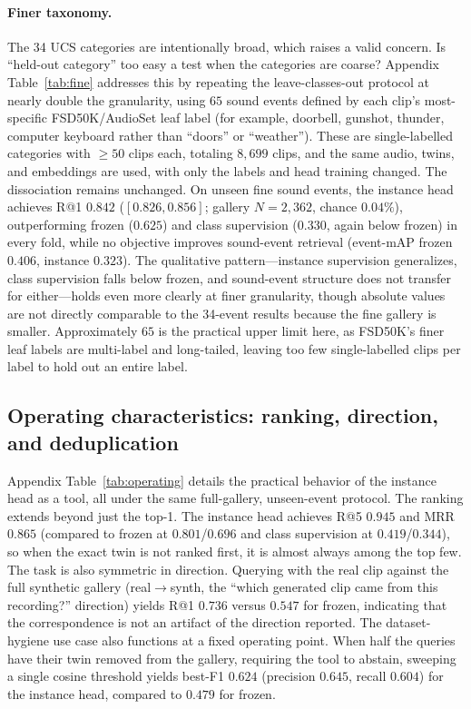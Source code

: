 \documentclass{article}
\begin{document}
\paragraph{Finer taxonomy.} The 34 UCS categories are intentionally broad, which raises a valid concern. Is ``held-out category'' too easy a test when the categories are coarse? Appendix Table~\ref{tab:fine} addresses this by repeating the leave-classes-out protocol at nearly double the granularity, using $65$ sound events defined by each clip's most-specific FSD50K/AudioSet leaf label (for example, doorbell, gunshot, thunder, computer keyboard rather than ``doors'' or ``weather''). These are single-labelled categories with $\ge 50$ clips each, totaling $8{,}699$ clips, and the same audio, twins, and embeddings are used, with only the labels and head training changed. The dissociation remains unchanged. On unseen fine sound events, the instance head achieves R@1 $0.842$ ($[0.826,0.856]$; gallery $N\!=\!2{,}362$, chance $0.04\%$), outperforming frozen ($0.625$) and class supervision ($0.330$, again below frozen) in every fold, while no objective improves sound-event retrieval (event-mAP frozen $0.406$, instance $0.323$). The qualitative pattern---instance supervision generalizes, class supervision falls below frozen, and sound-event structure does not transfer for either---holds even more clearly at finer granularity, though absolute values are not directly comparable to the 34-event results because the fine gallery is smaller. Approximately $65$ is the practical upper limit here, as FSD50K's finer leaf labels are multi-label and long-tailed, leaving too few single-labelled clips per label to hold out an entire label.

\subsection{Operating characteristics: ranking, direction, and deduplication}
\label{sec:operating}
Appendix Table~\ref{tab:operating} details the practical behavior of the instance head as a tool, all under the same full-gallery, unseen-event protocol. The ranking extends beyond just the top-1. The instance head achieves R@5 $0.945$ and MRR $0.865$ (compared to frozen at $0.801$/$0.696$ and class supervision at $0.419$/$0.344$), so when the exact twin is not ranked first, it is almost always among the top few. The task is also symmetric in direction. Querying with the real clip against the full synthetic gallery (real$\to$synth, the ``which generated clip came from this recording?'' direction) yields R@1 $0.736$ versus $0.547$ for frozen, indicating that the correspondence is not an artifact of the direction reported. The dataset-hygiene use case also functions at a fixed operating point. When half the queries have their twin removed from the gallery, requiring the tool to abstain, sweeping a single cosine threshold yields best-F1 $0.624$ (precision $0.645$, recall $0.604$) for the instance head, compared to $0.479$ for frozen.
\end{document}

